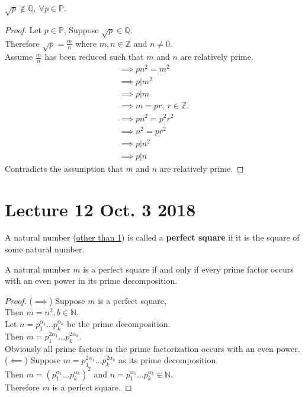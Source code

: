 \documentclass[11pt]{article}
\begin{document}
	\begin{example}
		$\sqrt{p} \notin \mathbb{Q},\ \forall p \in \mathbb{P}$.
	\end{example}
	
	\begin{proof}
		Let $p \in \mathbb{P}$,
		Suppose $\sqrt{p} \in \mathbb{Q}$. \\
		Therefore $\sqrt{p} = \frac{m}{n}$ where $m, n \in \mathbb{Z}$ and $n \neq 0$. \\
		Assume $\frac{m}{n}$ has been reduced such that $m$ and $n$ are relatively prime. \\
		\begin{gather*}
			\implies p n^2 = m^2 \\
			\implies p | m^2 \\
			\implies p | m \\
			\implies m = pr,\ r \in \mathbb{Z}. \\
			\implies pn^2 = p^2 r^2 \\
			\implies n^2 = p r^2 \\
			\implies p | n^2 \\
			\implies p | n
		\end{gather*}
		Contradicts the assumption that $m$ and $n$ are relatively prime.
	\end{proof}
	
	\section{Lecture 12 Oct. 3 2018}
	\begin{definition}
		A natural number (\ul{other than 1}) is called a \textbf{perfect square} if it is the square of some natural number.
	\end{definition}
	
	\begin{theorem}
		A natural number $m$ is a perfect square if and only if every prime factor occurs with an even power in its prime decomposition.
	\end{theorem}
	
	\begin{proof}
		($\implies$) Suppose $m$ is a perfect square, \\
		Then $m = n^2, b \in \mathbb{N}$. \\
		Let $n = p_1^{\alpha_1} \dots p_k^{\alpha_k}$ be the prime decomposition. \\
		Then $m = p_1^{2\alpha_1} \dots p_k^{2\alpha_k}$. \\
		Obviously all prime factors in the prime factorization occurs with an even power. \\
		($\impliedby$) Suppose $m = p_1^{2\alpha_1} \dots p_k^{2\alpha_k}$ as its prime decomposition. \\
		Then $m = (p_1^{\alpha_1} \dots p_k^{\alpha_k})^2$ and $n = p_1^{\alpha_1} \dots p_k^{\alpha_k} \in \mathbb{N}$. \\
		Therefore $m$ is a perfect square.
	\end{proof}
	
\end{document}
